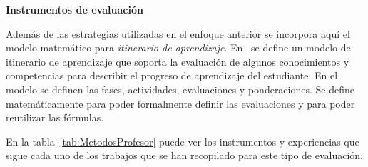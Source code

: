 





\bigskip
\textbf{Instrumentos de evaluación}
\bigskip

Además de las estrategias utilizadas en el enfoque anterior se incorpora aquí el modelo matemático para \emph{itinerario de aprendizaje}. En~\cite{yang2014fine} se define un modelo de itinerario de aprendizaje que soporta la evaluación de algunos conocimientos y competencias para describir el progreso de aprendizaje del estudiante. En el modelo se definen las fases, actividades, evaluaciones y ponderaciones. Se define matemáticamente para poder formalmente definir las evaluaciones y para poder reutilizar las fórmulas. 

En la tabla~\ref{tab:MetodosProfesor} puede ver los instrumentos y experiencias que sigue cada uno de los trabajos que se han recopilado para este tipo de evaluación.

